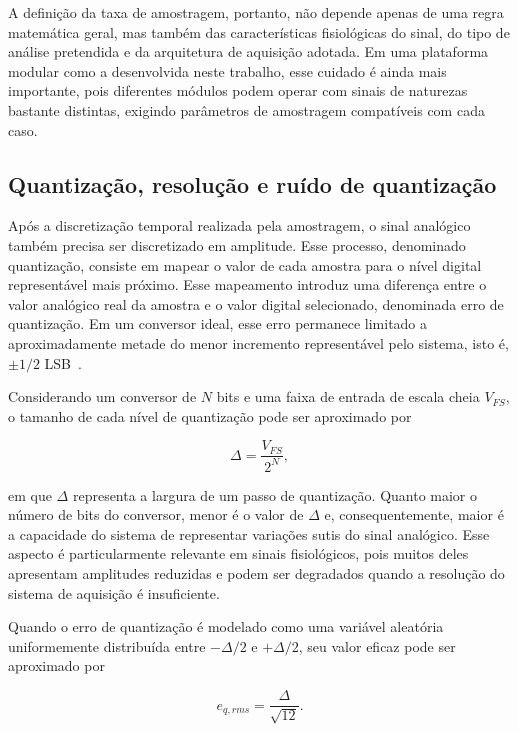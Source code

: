 \documentclass[a4paper,12pt]{fcte}
\begin{document}
A definição da taxa de amostragem, portanto, não depende apenas de uma regra matemática geral, mas também das características fisiológicas do sinal, do tipo de análise pretendida e da arquitetura de aquisição adotada. Em uma plataforma modular como a desenvolvida neste trabalho, esse cuidado é ainda mais importante, pois diferentes módulos podem operar com sinais de naturezas bastante distintas, exigindo parâmetros de amostragem compatíveis com cada caso.

\subsection{Quantização, resolução e ruído de quantização}

Após a discretização temporal realizada pela amostragem, o sinal analógico também precisa ser discretizado em amplitude. Esse processo, denominado quantização, consiste em mapear o valor de cada amostra para o nível digital representável mais próximo. Esse mapeamento introduz uma diferença entre o valor analógico real da amostra e o valor digital selecionado, denominada erro de quantização. Em um conversor ideal, esse erro permanece limitado a aproximadamente metade do menor incremento representável pelo sistema, isto é, $\pm 1/2$ LSB~\cite{kester2008mt001}.

Considerando um conversor de $N$ bits e uma faixa de entrada de escala cheia $V_{FS}$, o tamanho de cada nível de quantização pode ser aproximado por

\begin{equation}
    \Delta = \frac{V_{FS}}{2^N},
\end{equation}

\noindent em que $\Delta$ representa a largura de um passo de quantização. Quanto maior o número de bits do conversor, menor é o valor de $\Delta$ e, consequentemente, maior é a capacidade do sistema de representar variações sutis do sinal analógico. Esse aspecto é particularmente relevante em sinais fisiológicos, pois muitos deles apresentam amplitudes reduzidas e podem ser degradados quando a resolução do sistema de aquisição é insuficiente.

Quando o erro de quantização é modelado como uma variável aleatória uniformemente distribuída entre $-\Delta/2$ e $+\Delta/2$, seu valor eficaz pode ser aproximado por

\begin{equation}
    e_{q,rms} = \frac{\Delta}{\sqrt{12}}.
\end{equation}
\end{document}
